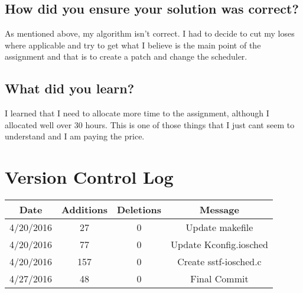 \documentclass[letterpaper,10pt,titlepage,draftclsnofoot,onecolumn]{IEEEtran}
\begin{document}
\subsection{How did you ensure your solution was correct?}
As mentioned above, my algorithm isn't correct. I had to decide to cut my loses where applicable and try to get what I believe is the main point of the assignment and that is to create a patch and change the scheduler. 
\subsection{What did you learn?}
I learned that I need to allocate more time to the assignment, although I allocated well over 30 hours. This is one of those things that I just cant seem to understand and I am paying the price. 



\section{Version Control Log}

\begin{tabular}{|| c c c c ||}
\hline
Date & Additions & Deletions & Message\\
\hline
4/20/2016 & 27 & 0 & Update makefile\\
\hline
4/20/2016 & 77 & 0 & Update Kconfig.iosched\\
\hline
4/20/2016 & 157 & 0 & Create sstf-iosched.c\\
\hline
4/27/2016 & 48 & 0 & Final Commit\\

\hline 
\end{tabular}
\end{document}
